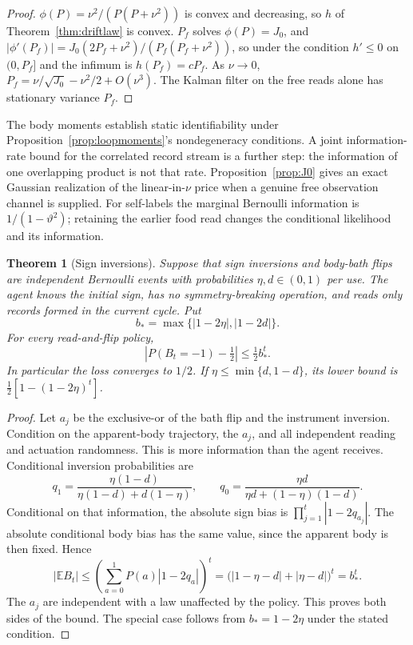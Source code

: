 \documentclass[12pt]{article}
\newtheorem{theorem}{Theorem}
\theoremstyle{definition}
\newcommand{\E}{\mathbb E}
\begin{document}
\begin{proof}
$\phi(P)=\nu^2/(P(P+\nu^2))$ is convex and decreasing, so $h$ of Theorem~\ref{thm:driftlaw} is convex. $P_f$ solves $\phi(P)=J_0$, and $|\phi'(P_f)|=J_0(2P_f+\nu^2)/(P_f(P_f+\nu^2))$, so under the condition $h'\le0$ on $(0,P_f]$ and the infimum is $h(P_f)=cP_f$. As $\nu\to0$, $P_f=\nu/\sqrt{J_0}-\nu^2/2+O(\nu^3)$. The Kalman filter on the free reads alone has stationary variance $P_f$.
\end{proof}

The body moments establish static identifiability under Proposition~\ref{prop:loopmoments}'s nondegeneracy conditions. A joint information-rate bound for the correlated record stream is a further step: the information of one overlapping product is not that rate. Proposition~\ref{prop:J0} gives an exact Gaussian realization of the linear-in-$\nu$ price when a genuine free observation channel is supplied. For self-labels the marginal Bernoulli information is $1/(1-\vartheta^2)$; retaining the earlier food read changes the conditional likelihood and its information.

\begin{theorem}[Sign inversions]
\label{thm:inversion}
Suppose that sign inversions and body-bath flips are independent Bernoulli
events with probabilities $\eta,d\in(0,1)$ per use. The agent knows the initial
sign, has no symmetry-breaking operation, and reads only records formed in
the current cycle. Put
\[
 b_* = \max\{|1-2\eta|,|1-2d|\}.
\]
For every read-and-flip policy,
\[
 \left|P(B_t=-1)-\tfrac12\right|\le\tfrac12 b_*^t.
\]
In particular the loss converges to $1/2$. If
$\eta\le\min\{d,1-d\}$, its lower bound is
$\tfrac12[1-(1-2\eta)^t]$.
\end{theorem}
\begin{proof}
Let $a_j$ be the exclusive-or of the bath flip and the instrument inversion.
Condition on the apparent-body trajectory, the $a_j$, and all independent
reading and actuation randomness. This is more information than the agent
receives. Conditional inversion probabilities are
\[
 q_1=\frac{\eta(1-d)}{\eta(1-d)+d(1-\eta)},\qquad
 q_0=\frac{\eta d}{\eta d+(1-\eta)(1-d)}.
\]
Conditional on that information, the absolute sign bias is
$\prod_{j=1}^t|1-2q_{a_j}|$. The absolute conditional body bias has the same
value, since the apparent body is then fixed. Hence
\[
 |\E B_t|\le
 \left(\sum_{a=0}^1P(a)|1-2q_a|\right)^t
 =\bigl(|1-\eta-d|+|\eta-d|\bigr)^t=b_*^t.
\]
The $a_j$ are independent with a law unaffected by the policy. This proves
both sides of the bound. The special case follows from
$b_*=1-2\eta$ under the stated condition.
\end{proof}
\end{document}
